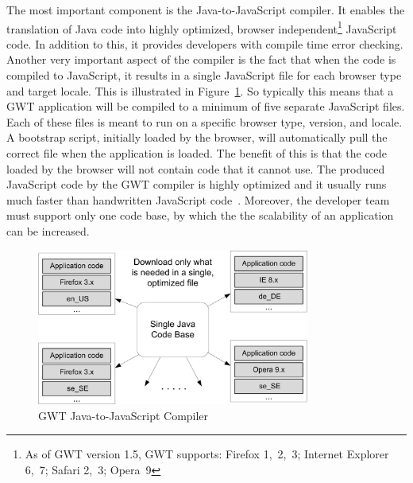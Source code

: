 The most important component is the Java-to-JavaScript compiler. It enables the 
translation of Java code into highly optimized, browser 
independent\footnote{As of GWT version 1.5, GWT supports: 
Firefox 1,~2,~3; Internet Explorer 6,~7; Safari 2,~3; Opera~9}
JavaScript code. 
In addition to this, it provides developers with compile time error checking. 
Another very important
aspect of the compiler is the fact that when the code is compiled to JavaScript,
it results in 
a single JavaScript file for each browser type and target locale. This is illustrated 
in Figure~\ref{fig:gwt01}. So typically this means that a GWT application will be compiled to 
a minimum of five separate JavaScript files. Each of these files is meant to run 
on a specific browser type, version, and locale. A bootstrap script, initially 
loaded by the browser, will 
automatically pull the correct file when the
application is loaded. The benefit of this is that the code loaded by the browser 
will not contain code that it cannot use. The produced JavaScript code by the GWT 
compiler is highly optimized and it usually runs much faster than handwritten 
JavaScript code~\cite{wgio1}. Moreover, the developer team must support only
one code base, by which the the scalability of an application can be increased.  

\begin{figure}[h]
	\begin{center}
		\includegraphics[width=0.8\textwidth]{./img/gwt01.png}
		\caption{GWT Java-to-JavaScript Compiler}
		\label{fig:gwt01}
	\end{center}
\end{figure}

